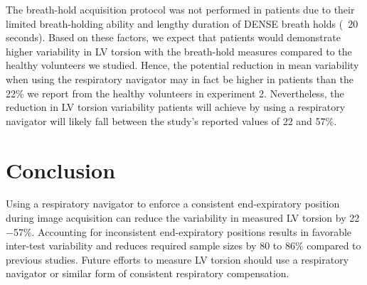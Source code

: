 	The breath-hold acquisition protocol was not performed in patients due to their limited breath-holding ability and lengthy duration of DENSE breath holds (~20 seconds). Based on these factors, we expect that patients would demonstrate higher variability in LV torsion with the breath-hold measures compared to the healthy volunteers we studied. Hence, the potential reduction in mean variability when using the respiratory navigator may in fact be higher in patients than the 22\% we report from the healthy volunteers in experiment 2. Nevertheless, the reduction in LV torsion variability patients will achieve by using a respiratory navigator will likely fall between the study's reported values of 22 and 57\%.

\section{Conclusion}
	Using a respiratory navigator to enforce a consistent end-expiratory position during image acquisition can reduce the variability in measured LV torsion by 22$-$57\%. Accounting for inconsistent end-expiratory positions results in favorable inter-test variability and reduces required sample sizes by 80 to 86\% compared to previous studies. Future efforts to measure LV torsion should use a respiratory navigator or similar form of consistent respiratory compensation.





